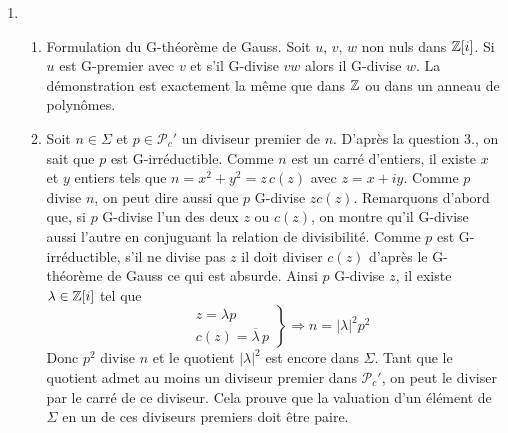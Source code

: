 \begin{enumerate}
\item
\begin{enumerate}
  \item Formulation du G-théorème de Gauss. Soit $u$, $v$, $w$ non nuls dans $\mathbb{Z}[i]$. Si $u$ est G-premier avec $v$ et s'il G-divise $vw$ alors il G-divise $w$. La démonstration est exactement la même que dans $\mathbb{Z}$ ou dans un anneau de polynômes. 
  \item Soit $n\in \Sigma$ et $p\in \mathcal{P}_c'$ un diviseur premier de $n$. D'après la question 3., on sait que $p$ est G-irréductible. Comme $n$ est un carré d'entiers, il existe $x$ et $y$ entiers tels que $n=x^2+y^2=z\,c(z)$ avec $z=x+iy$.\newline
  Comme $p$ divise $n$, on peut dire aussi que $p$ G-divise $zc(z)$.\newline
  Remarquons d'abord que, si $p$ G-divise l'un des deux $z$ ou $c(z)$, on montre qu'il G-divise aussi l'autre en conjuguant la relation de divisibilité.\newline
  Comme $p$ est G-irréductible, s'il ne divise pas $z$ il doit diviser $c(z)$ d'après le G-théorème de Gauss ce qui est absurde. Ainsi $p$ G-divise $z$, il existe $\lambda\in \mathbb{Z}[i]$ tel que 
\begin{displaymath}
  \left. 
\begin{aligned}
&z=\lambda p\\  &c(z)= \overline{\lambda}\,p
\end{aligned}
\right\rbrace \Rightarrow n = |\lambda|^2 p^2
\end{displaymath}
Donc $p^2$ divise $n$ et le quotient $|\lambda|^2$ est encore dans $\Sigma$.\newline
Tant que le quotient admet au moins un diviseur premier dans $\mathcal{P}_c'$, on peut le diviser par le carré de ce diviseur. Cela prouve que la valuation d'un élément de $\Sigma$ en un de ces diviseurs premiers doit être paire.  
\end{enumerate}
\end{enumerate}

